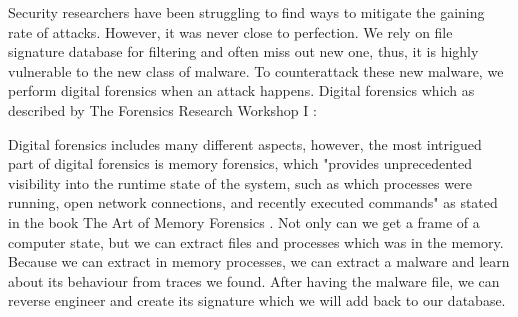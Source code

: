 Security researchers have been struggling to find ways to mitigate the gaining rate of attacks. However, it was never close to perfection. We rely on file signature database for filtering and often miss out new one, thus, it is highly vulnerable to the new class of malware. To counterattack these new malware, we perform digital forensics when an attack happens. Digital forensics which as described by The Forensics Research Workshop I \cite{roadmap}:



Digital forensics includes many different aspects, however, the most intrigued part of digital forensics is memory forensics, which "provides unprecedented visibility into the runtime state of the system, such as which processes were running, open network connections, and recently executed commands" as stated in the book The Art of Memory Forensics \cite{ligh2014art}. Not only can we get a frame of a computer state, but we can extract files and processes which was in the memory. Because we can extract in memory processes, we can extract a malware and learn about its behaviour from traces we found. After having the malware file, we can reverse engineer and create its signature which we will add back to our database.

